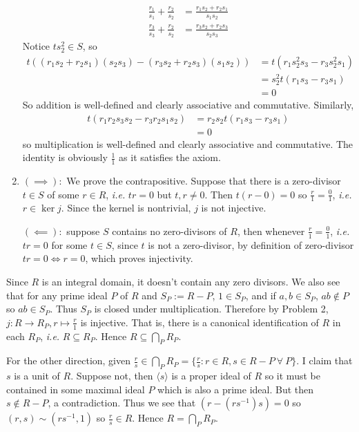 \documentclass[12pt,class=article,crop=false]{standalone}
\begin{document}
\begin{problem}[2]
\begin{enumerate}[label=(\alph*)]
		\begin{align*}
			\frac{r_1}{s_1}+ \frac{r_2}{s_2} &= \frac{r_1s_2+r_2s_1}{s_1s_2 }\\
			\frac{r_3}{ s_3} + \frac{r_2}{ s_2}&= \frac{r_3s_2+r_2s_3}{s_2s_3 } 
		\end{align*}
Notice $ ts_2^2 \in S$, so
		\begin{align*}
			t((r_1s_2+r_2s_1)(s_2s_3) - (r_3s_2+r_2s_3)(s_1s_2)) &= t(r_1s_2^2s_3-r_3s_2^2s_1) \\
			&=s_2^2 t(r_1s_3-r_3s_1) \\
			&= 0 
		\end{align*}
		So addition is well-defined and clearly associative and commutative. Similarly,
		\begin{align*}
			t(r_1r_2s_3s_2-r_3r_2s_1s_2) &=r_2s_2 t(r_1 s_3 - r_3s_1) \\
			&= 0 
		\end{align*}
		so multiplication is well-defined and clearly associative and commutative. The identity is obviously $ \frac{1}{1}$ as it satisfies the axiom.
	\item $ (\implies):$ We prove the contrapositive. Suppose that there is a zero-divisor $ t \in S$ of some $ r \in R$, \emph{i.e.} $ tr=0$ but  $ t,r \neq 0$. Then $ t(r-0)=0$ so  $ \frac{r}{1} = \frac{0}{1}$, \emph{i.e.}  $r \in \ker j$. Since the kernel is nontrivial, $ j$ is not injective.
		
		$ (\impliedby):$ suppose $ S$ contains no zero-divisors of  $ R$, then whenever  $ \frac{r}{1} = \frac{0}{1}$, \emph{i.e.} $ tr=0$ for some  $ t \in S$, since $ t$ is not a zero-divisor, by definition of zero-divisor $ tr =0 \iff r=0$, which proves injectivity.
\end{enumerate}
\end{problem}
\begin{problem}[3]
Since $ R$ is an integral domain, it doesn't contain any zero divisors. We also see that for any prime ideal $P $ of  $ R$ and  $ S_P:= R -P$, $ 1 \in S_P$, and if $ a,b \in S_P$, $ab \not\in P$ so $ ab \in S_P$. Thus $ S_P$ is closed under multiplication. Therefore by Problem 2, $ j: R \to R_P, r \mapsto \frac{r}{1}$ is injective. That is, there is a canonical identification of $ R$ in each $ R_P$, \emph{i.e.} $ R \subseteq R_P$. Hence $ R \subseteq \bigcap_{ P}R_P $. 

For the other direction, given $ \frac{r}{s} \in \bigcap_{ P} R_P = \{\frac{r}{s}: r \in R, s \in R-P \ \forall \ P\} $. I claim that $ s$ is a unit of $ R$. Suppose not, then  $ \langle s \rangle$ is a proper ideal of $ R$ so it must be contained in some maximal ideal  $ P$ which is also a prime ideal. But then $ s \not\in R-P$, a contradiction. Thus we see that $ (r -(rs^{-1})s) =0$ so $ (r,s) \sim (rs ^{-1},1)$ so $ \frac{r}{s} \in R$. Hence $ R = \bigcap_{ P} R_P $.
\end{problem}
\end{document}
